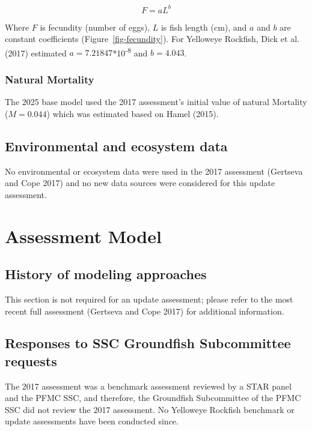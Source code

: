 \documentclass[
]{scrartcl}
\begin{document}
\[
F = aL^b
\]

Where \(F\) is fecundity (number of eggs), \(L\) is fish length (cm),
and \(a\) and \(b\) are constant coefficients
(Figure~\ref{fig-fecundity}). For Yelloweye Rockfish, Dick et al. (2017)
estimated \(a = 7.21847\)*10\textsuperscript{-8} and \(b = 4.043\).

\subsubsection{Natural Mortality}\label{natural-mortality}

The 2025 base model used the 2017 assessment's initial value of natural
Mortality (\(M = 0.044\)) which was estimated based on Hamel (2015).

\subsection{Environmental and ecosystem
data}\label{environmental-and-ecosystem-data}

No environmental or ecosystem data were used in the 2017 assessment
(Gertseva and Cope 2017) and no new data sources were considered for
this update assessment.

\newpage{}

\section{Assessment Model}\label{assessment-model}

\subsection{History of modeling
approaches}\label{history-of-modeling-approaches}

This section is not required for an update assessment; please refer to
the most recent full assessment (Gertseva and Cope 2017) for additional
information.

\subsection{Responses to SSC Groundfish Subcommittee
requests}\label{responses-to-ssc-groundfish-subcommittee-requests}

The 2017 assessment was a benchmark assessment reviewed by a STAR panel
and the PFMC SSC, and therefore, the Groundfish Subcommittee of the PFMC
SSC did not review the 2017 assessment. No Yelloweye Rockfish benchmark
or update assessments have been conducted since.
\end{document}

